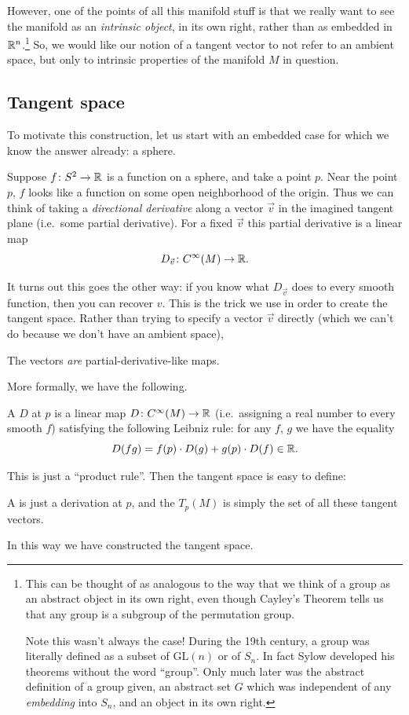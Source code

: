 However, one of the points of all this manifold stuff
is that we really want to see the manifold
as an \emph{intrinsic object}, in its own right,
rather than as embedded in $\mathbb R^n$.\footnote{This
	can be thought of as analogous to the way
	that we think of a group as an abstract object in its own right,
	even though Cayley's Theorem tells us that any group is a subgroup
	of the permutation group.

	Note this wasn't always the case!
	During the 19th century, a group was literally defined
	as a subset of $\text{GL}(n)$ or of $S_n$.
	In fact Sylow developed his theorems without the word ``group''.
	Only much later was the abstract definition of a group given,
	an abstract set $G$ which was independent of any \emph{embedding} into $S_n$,
	and an object in its own right.}
So, we would like our notion of a tangent vector to not refer to an ambient space,
but only to intrinsic properties of the manifold $M$ in question.

\subsection{Tangent space}
To motivate this construction, let us start
with an embedded case for which we know the answer already:
a sphere.

Suppose $f \colon S^2 \to \mathbb R$ is a
function on a sphere, and take a point $p$.
Near the point $p$, $f$ looks like a function
on some open neighborhood of the origin.
Thus we can think of taking a \emph{directional derivative}
along a vector $\vec v$ in the imagined tangent plane
(i.e.\ some partial derivative).
For a fixed $\vec v$ this partial derivative is a linear map
\[ D_{\vec v} \colon C^\infty(M) \to \mathbb R. \]

It turns out this goes the other way:
if you know what $D_{\vec v}$ does to every smooth function,
then you can recover $v$.
This is the trick we use in order to create the tangent space.
Rather than trying to specify a vector $\vec v$ directly
(which we can't do because we don't have an ambient space),
\begin{moral}
	The vectors \emph{are} partial-derivative-like maps.
\end{moral}
More formally, we have the following.
\begin{definition}
	A  $D$ at $p$ is a linear map
	$D \colon C^\infty(M) \to \mathbb R$
	(i.e.\ assigning a real number to every smooth $f$)
	satisfying the following Leibniz rule:
	for any $f$, $g$ we have the equality
	\[ D(fg) = f(p) \cdot D(g) + g(p) \cdot D(f) \in \mathbb R. \]
\end{definition}
This is just a ``product rule''.
Then the tangent space is easy to define:
\begin{definition}
	A  is just a derivation at $p$, and
	the  $T_p(M)$ is simply
	the set of all these tangent vectors.
\end{definition}
In this way we have constructed the tangent space.

